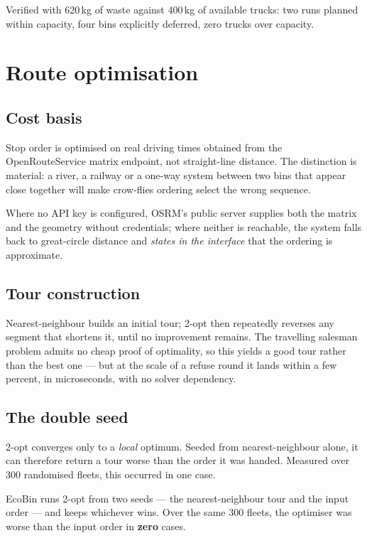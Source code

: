 \documentclass[11pt,a4paper]{article}
\begin{document}
Verified with 620\,kg of waste against 400\,kg of available trucks: two
runs planned within capacity, four bins explicitly deferred, zero trucks
over capacity.

\section{Route optimisation}

\subsection{Cost basis}

Stop order is optimised on real driving times obtained from the
OpenRouteService matrix endpoint, not straight-line distance. The
distinction is material: a river, a railway or a one-way system between
two bins that appear close together will make crow-flies ordering select
the wrong sequence.

Where no API key is configured, OSRM's public server supplies both the
matrix and the geometry without credentials; where neither is reachable,
the system falls back to great-circle distance and \emph{states in the
interface} that the ordering is approximate.

\subsection{Tour construction}

Nearest-neighbour builds an initial tour; 2-opt then repeatedly reverses
any segment that shortens it, until no improvement remains. The travelling
salesman problem admits no cheap proof of optimality, so this yields a
good tour rather than the best one --- but at the scale of a refuse round
it lands within a few percent, in microseconds, with no solver dependency.

\subsection{The double seed}

2-opt converges only to a \emph{local} optimum. Seeded from
nearest-neighbour alone, it can therefore return a tour worse than the
order it was handed. Measured over 300 randomised fleets, this occurred in
one case.

EcoBin runs 2-opt from two seeds --- the nearest-neighbour tour and the
input order --- and keeps whichever wins. Over the same 300 fleets, the
optimiser was worse than the input order in \textbf{zero} cases.
\end{document}
